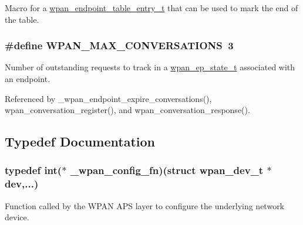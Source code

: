 Macro for a \hyperlink{structwpan__endpoint__table__entry__t}{wpan\-\_\-endpoint\-\_\-table\-\_\-entry\-\_\-t} that can be used to mark the end of the table. 

\hypertarget{group__wpan__aps_gae34b1efc8ba99add17fcd767852197d4}{
\subsubsection[{W\-P\-A\-N\-\_\-\-M\-A\-X\-\_\-\-C\-O\-N\-V\-E\-R\-S\-A\-T\-I\-O\-N\-S}]{\setlength{\rightskip}{0pt plus 5cm}\#define W\-P\-A\-N\-\_\-\-M\-A\-X\-\_\-\-C\-O\-N\-V\-E\-R\-S\-A\-T\-I\-O\-N\-S~3}}\label{group__wpan__aps_gae34b1efc8ba99add17fcd767852197d4}


Number of outstanding requests to track in a \hyperlink{structwpan__ep__state__t}{wpan\-\_\-ep\-\_\-state\-\_\-t} associated with an endpoint. 



Referenced by \-\_\-wpan\-\_\-endpoint\-\_\-expire\-\_\-conversations(), wpan\-\_\-conversation\-\_\-register(), and wpan\-\_\-conversation\-\_\-response().



\subsection{Typedef Documentation}
\hypertarget{group__wpan__aps_ga546985b77369b8c1f90620607b3d0891}{
\subsubsection[{\-\_\-wpan\-\_\-config\-\_\-fn}]{\setlength{\rightskip}{0pt plus 5cm}typedef int($\ast$ \-\_\-wpan\-\_\-config\-\_\-fn)(struct {\bf wpan\-\_\-dev\-\_\-t} $\ast$dev,...)}}\label{group__wpan__aps_ga546985b77369b8c1f90620607b3d0891}


Function called by the W\-P\-A\-N A\-P\-S layer to configure the underlying network device. 

